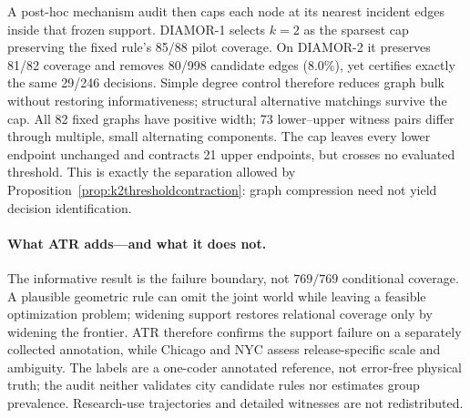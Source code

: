 A post-hoc mechanism audit then caps each node at its nearest incident edges
inside that frozen support. DIAMOR-1 selects $k=2$ as the sparsest cap preserving
the fixed rule's 85/88 pilot coverage. On DIAMOR-2 it preserves 81/82 coverage
and removes 80/998 candidate edges (8.0\%), yet certifies exactly the same
29/246 decisions. Simple degree control therefore reduces graph bulk without
restoring informativeness; structural alternative matchings survive the cap.
All 82 fixed graphs have positive width; 73 lower--upper witness pairs differ
through multiple, small alternating components. The cap leaves every lower
endpoint unchanged and contracts 21 upper endpoints, but crosses no evaluated
threshold. This is exactly the separation allowed by
Proposition~\ref{prop:k2thresholdcontraction}: graph compression need not yield
decision identification.

\paragraph{What ATR adds---and what it does not.}
The informative result is the failure boundary, not $769/769$ conditional
coverage. A plausible geometric rule can omit the joint world while leaving a
feasible optimization problem; widening support restores relational coverage
only by widening the frontier. ATR therefore confirms the support failure on a
separately collected annotation, while Chicago and NYC assess release-specific
scale and ambiguity. The labels are a one-coder annotated reference, not
error-free physical truth; the audit neither validates city candidate rules nor
estimates group prevalence. Research-use trajectories and detailed witnesses
are not redistributed.
